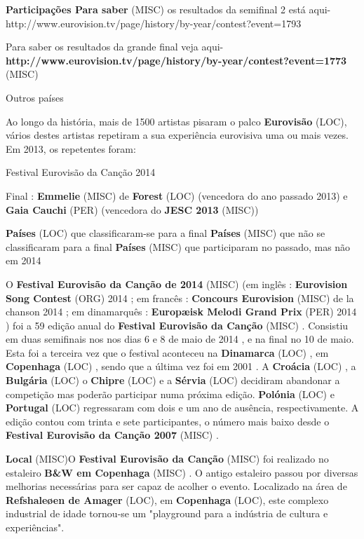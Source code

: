 \documentclass[12pt,a4paper]{article}
\begin{document}
\textbf{Participações Para saber} (MISC) os resultados da semifinal 2 está aqui- http://www.eurovision.tv/page/history/by-year/contest?event=1793

Para saber os resultados da grande final veja aqui- \textbf{http://www.eurovision.tv/page/history/by-year/contest?event=1773} (MISC)



Outros países

Ao longo da história, mais de 1500 artistas pisaram o palco \textbf{Eurovisão} (LOC), vários destes artistas repetiram a sua experiência eurovisiva uma ou mais vezes. Em 2013, os repetentes foram:



Festival Eurovisão da Canção 2014



Final : \textbf{Emmelie} (MISC) de \textbf{Forest} (LOC) (vencedora do ano passado 2013) e \textbf{Gaia Cauchi} (PER) (vencedora do \textbf{JESC 2013} (MISC))

\textbf{Países} (LOC) que classificaram-se para a final \textbf{Países} (MISC) que não se classificaram para a final \textbf{Países} (MISC) que participaram no passado, mas não em 2014

O \textbf{Festival Eurovisão da Canção de 2014} (MISC) (em inglês : \textbf{Eurovision Song Contest} (ORG) 2014 ; em francês : \textbf{Concours Eurovision} (MISC) de la chanson 2014 ; em dinamarquês : \textbf{Europæisk Melodi Grand Prix} (PER) 2014 ) foi a 59 edição anual do \textbf{Festival Eurovisão da Canção} (MISC) . Consistiu em duas semifinais nos nos dias 6 e 8 de maio de 2014 , e na final no 10 de maio. Esta foi a terceira vez que o festival aconteceu na \textbf{Dinamarca} (LOC) , em \textbf{Copenhaga} (LOC) , sendo que a última vez foi em 2001 . A \textbf{Croácia} (LOC) , a \textbf{Bulgária} (LOC) o \textbf{Chipre} (LOC) e a \textbf{Sérvia} (LOC) decidiram abandonar a competição mas poderão participar numa próxima edição. \textbf{Polónia} (LOC) e \textbf{Portugal} (LOC) regressaram com dois e um ano de ausência, respectivamente. A edição contou com trinta e sete participantes, o número mais baixo desde o \textbf{Festival Eurovisão da Canção 2007} (MISC) .



\textbf{Local} (MISC)O \textbf{Festival Eurovisão da Canção} (MISC) foi realizado no estaleiro \textbf{B\&W em Copenhaga} (MISC) . O antigo estaleiro passou por diversas melhorias necessárias para ser capaz de acolher o evento. Localizado na área de \textbf{Refshaleøen de Amager} (LOC), em \textbf{Copenhaga} (LOC), este complexo industrial de idade tornou-se um "playground para a indústria de cultura e experiências".
\end{document}
